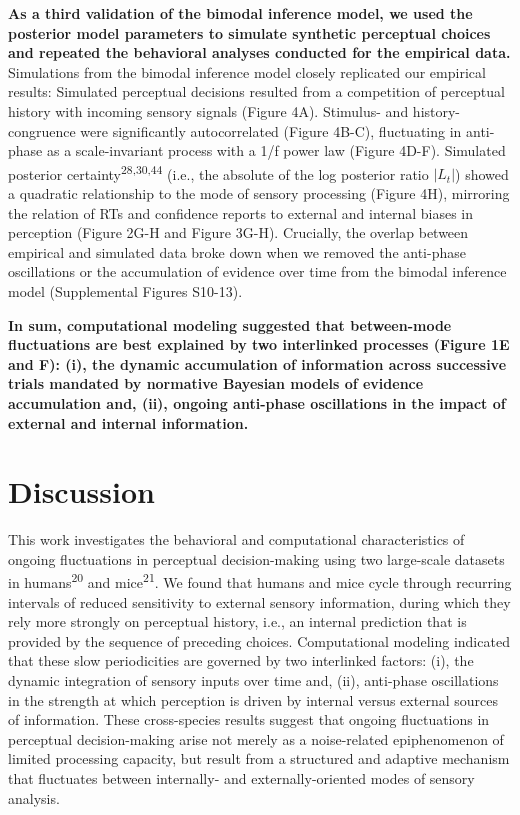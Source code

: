\documentclass[
]{article}
\begin{document}
\textbf{As a third validation of the bimodal inference model, we used
the posterior model parameters to simulate synthetic perceptual choices
and repeated the behavioral analyses conducted for the empirical data.}
Simulations from the bimodal inference model closely replicated our
empirical results: Simulated perceptual decisions resulted from a
competition of perceptual history with incoming sensory signals (Figure
4A). Stimulus- and history-congruence were significantly autocorrelated
(Figure 4B-C), fluctuating in anti-phase as a scale-invariant process
with a 1/f power law (Figure 4D-F). Simulated posterior
certainty\textsuperscript{28,30,44} (i.e., the absolute of the log
posterior ratio \(|L_t|\)) showed a quadratic relationship to the mode
of sensory processing (Figure 4H), mirroring the relation of RTs and
confidence reports to external and internal biases in perception (Figure
2G-H and Figure 3G-H). Crucially, the overlap between empirical and
simulated data broke down when we removed the anti-phase oscillations or
the accumulation of evidence over time from the bimodal inference model
(Supplemental Figures S10-13).

\textbf{In sum, computational modeling suggested that between-mode
fluctuations are best explained by two interlinked processes (Figure 1E
and F): (i), the dynamic accumulation of information across successive
trials mandated by normative Bayesian models of evidence accumulation
and, (ii), ongoing anti-phase oscillations in the impact of external and
internal information.}

\hypertarget{discussion}{%
\section{Discussion}\label{discussion}}

This work investigates the behavioral and computational characteristics
of ongoing fluctuations in perceptual decision-making using two
large-scale datasets in humans\textsuperscript{20} and
mice\textsuperscript{21}. We found that humans and mice cycle through
recurring intervals of reduced sensitivity to external sensory
information, during which they rely more strongly on perceptual history,
i.e., an internal prediction that is provided by the sequence of
preceding choices. Computational modeling indicated that these slow
periodicities are governed by two interlinked factors: (i), the dynamic
integration of sensory inputs over time and, (ii), anti-phase
oscillations in the strength at which perception is driven by internal
versus external sources of information. These cross-species results
suggest that ongoing fluctuations in perceptual decision-making arise
not merely as a noise-related epiphenomenon of limited processing
capacity, but result from a structured and adaptive mechanism that
fluctuates between internally- and externally-oriented modes of sensory
analysis.
\end{document}
